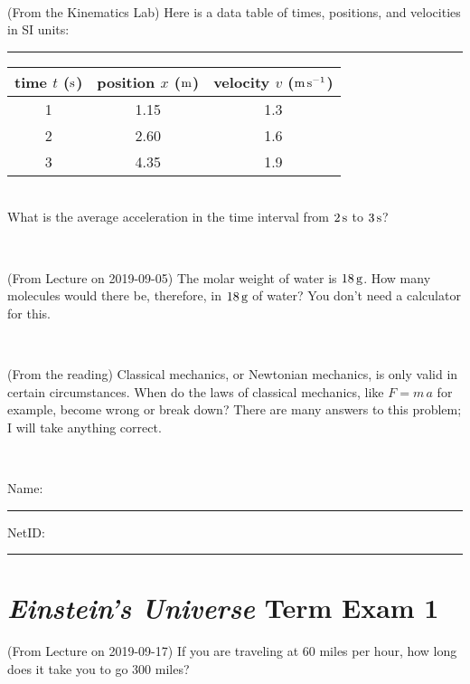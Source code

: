 \documentclass[12pt, letterpaper]{article}
\begin{document}
\vfill ~

\begin{problem} (From the Kinematics Lab)
Here is a data table of times, positions, and velocities in SI units:\\
\rule{1.0in}{0pt}\begin{tabular}{c|c|c}
time $t$ ($\mathrm{s}$) & position $x$ ($\mathrm{m}$) & velocity $v$ ($\mathrm{m}\,\mathrm{s}^{-1}$) \\
\hline
1 & 1.15 & 1.3 \\
2 & 2.60 & 1.6 \\
3 & 4.35 & 1.9 \\
\hline
\end{tabular}\\
What is the average acceleration in the time interval from $2\,\mathrm{s}$ to $3\,\mathrm{s}$?
\end{problem}


\vfill ~

\begin{problem} (From Lecture on 2019-09-05)
The molar weight of water is $18\,\mathrm{g}$. How many molecules would there
be, therefore, in $18\,\mathrm{g}$ of water? You don't need a calculator for
this.
\end{problem}


\vfill ~

\begin{problem} (From the reading)
Classical mechanics, or Newtonian mechanics, is only valid in certain
circumstances. When do the laws of classical mechanics, like $F =
m\,a$ for example, become wrong or break down? There are many answers
to this problem; I will take anything correct.
\end{problem}


\vfill ~


\cleardoublepage



\noindent
Name: \rule[-1ex]{0.60\textwidth}{0.1pt}
NetID: \rule[-1ex]{0.20\textwidth}{0.1pt}

\section*{\textsl{Einstein's Universe} Term Exam 1}
\setcounter{problem}{1}


\begin{problem} (From Lecture on 2019-09-17)
If you are traveling at 60 miles per hour, how long does
it take you to go 300 miles?
\end{problem}


\vfill ~
\end{document}
